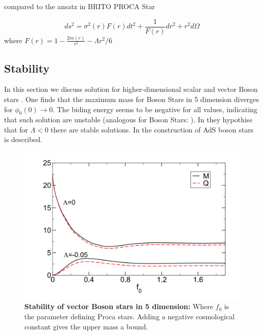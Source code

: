 \documentclass{article}
\begin{document}
compared to the ansatz in BRITO PROCA Star

\begin{equation}
ds^2 = \sigma^2(r)F(r)dt^2+ \frac{1}{F(r)}dr^2+r^2d\Omega
\end{equation}
where $F(r) = 1 - \frac{2 m(r)}{r^2}-\Lambda r^2/6$  

\subsection{Stability}
In this section we discuss solution for higher-dimensional scalar and vector Boson stars \cite{Duarte:2016lig}. One finds that the maximum mass for Boson Stars in 5 dimension diverges for $\phi_0(0) \rightarrow 0 $. The biding energy seems to be negative for all values, indicating that such solution are unstable (analogous for Boson Stars: \cite{Brihaye:2015jja}). In \cite{Duarte:2016lig} they hypothise that for $\Lambda < 0$ there are stable solutions. In \cite{Astefanesei:2003qy} the construction of AdS boson stars is described. 

\begin{figure}
  \includegraphics[width=\linewidth]{StabileADs.png}
	\caption{{\bf Stability of vector Boson stars in 5 dimension:} Where $f_0$ is the parameter defining Proca stars. Adding a negative cosmological constant gives the upper mass a bound.  }
  \label{fig:boat1}
\end{figure}

{}

\end{document}
